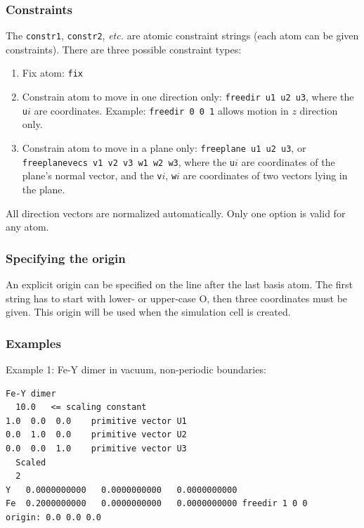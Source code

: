 \documentclass[a4paper,12pt,pdftex,onecolumn]{article}
\newcommand{\etc}{\emph{etc.}\xspace}
\begin{document}
\subsubsection{Constraints}

The \verb+constr1+, \verb+constr2+, \etc are atomic constraint strings
(each atom can be given constraints).
There are three possible constraint types:

\begin{enumerate}
\item Fix atom: \verb+fix+

\item Constrain atom to move in one direction only: \verb+freedir u1 u2 u3+,
where the \verb+u+$i$ are coordinates.
Example: \verb+freedir 0 0 1+ allows motion in $z$ direction only.

\item Constrain atom to move in a plane only: \verb+freeplane u1 u2 u3+, or
\newline
\verb+freeplanevecs v1 v2 v3 w1 w2 w3+,
where the \verb+u+$i$ are coordinates of the plane's normal vector, and
the \verb+v+$i$, \verb+w+$i$ are coordinates of two vectors lying in the plane.
\end{enumerate}

All direction vectors are normalized automatically. Only one option is valid for any
atom.






\subsubsection{Specifying the origin}

An explicit origin can be specified on the line after the last basis atom.
The first string has to start with lower- or upper-case O, then three coordinates
must be given. This origin will be used when the simulation cell is created.



\subsubsection{Examples}


Example 1: Fe-Y dimer in vacuum, non-periodic boundaries:

\begin{Verbatim}[fontsize=\relsize{-1},frame=single]
Fe-Y dimer
  10.0   <= scaling constant
1.0  0.0  0.0    primitive vector U1
0.0  1.0  0.0    primitive vector U2
0.0  0.0  1.0    primitive vector U3
  Scaled
  2
Y   0.0000000000   0.0000000000   0.0000000000
Fe  0.2000000000   0.0000000000   0.0000000000 freedir 1 0 0
origin: 0.0 0.0 0.0
\end{Verbatim}
\end{document}
